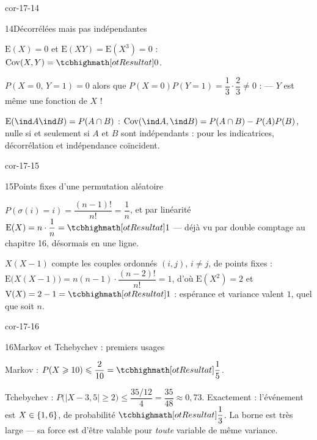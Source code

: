 \begin{blocLivre}{cor-17-14}
\begin{corrige}{14}{Décorrélées mais pas indépendantes}
\begin{questions}
  \item $\mathrm{E}(X)=0$ et $\mathrm{E}(XY)=\mathrm{E}(X^{3})=0$ :
    $\operatorname{Cov}(X,Y)=\res{0}$.
  \item $P(X=0,\,Y=1)=0$ alors que
    $P(X=0)P(Y=1)=\dfrac13\cdot\dfrac23\neq0$ :  — $Y$ est même une fonction de $X$ !
  \item $\mathrm{E}(\ind A\ind B)=P(A\cap B)$ :
    $\operatorname{Cov}(\ind A,\ind B)=P(A\cap B)-P(A)P(B)$, nulle si et
    seulement si $A$ et $B$ sont indépendants : pour les indicatrices,
    décorrélation et indépendance coïncident.
\end{questions}
\end{corrige}
\end{blocLivre}

\begin{blocLivre}{cor-17-15}
\begin{corrige}{15}{Points fixes d'une permutation aléatoire}
\begin{questions}
  \item $P(\sigma(i)=i)=\dfrac{(n-1)!}{n!}=\dfrac1n$, et par linéarité
    $\mathrm{E}(X)=n\cdot\dfrac1n=\res{1}$ — déjà vu par double comptage
    au chapitre 16, désormais en une ligne.
  \item $X(X-1)$ compte les couples ordonnés $(i,j)$, $i\neq j$, de
    points fixes :
    $\mathrm{E}\bigl(X(X-1)\bigr)=n(n-1)\cdot\dfrac{(n-2)!}{n!}=1$, d'où
    $\mathrm{E}(X^{2})=2$ et $\mathrm{V}(X)=2-1=\res{1}$ : espérance et
    variance valent $1$, quel que soit $n$.
\end{questions}
\end{corrige}
\end{blocLivre}

\begin{blocLivre}{cor-17-16}
\begin{corrige}{16}{Markov et Tchebychev : premiers usages}
\begin{questions}
  \item Markov : $P(X\geqslant10)\leqslant\dfrac{2}{10}=\res{\dfrac15}$.
  \item Tchebychev :
    $P\bigl(|X-3{,}5|\geqslant2\bigr)\leqslant\dfrac{35/12}{4}
    =\dfrac{35}{48}\approx0{,}73$. Exactement : l'événement est
    $X\in\left\{1,6\right\}$, de probabilité $\res{\dfrac13}$. La borne est très
    large — sa force est d'être valable pour \emph{toute} variable de
    même variance.
\end{questions}
\end{corrige}
\end{blocLivre}

